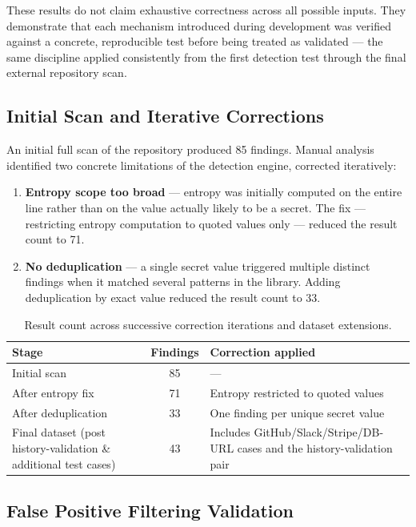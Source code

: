 \documentclass[12pt]{article}
\begin{document}
These results do not claim exhaustive correctness across all possible inputs. They demonstrate that each mechanism introduced during development was verified against a concrete, reproducible test before being treated as validated --- the same discipline applied consistently from the first detection test through the final external repository scan.

\subsection{Initial Scan and Iterative Corrections}

An initial full scan of the repository produced 85 findings. Manual analysis identified two concrete limitations of the detection engine, corrected iteratively:

\begin{enumerate}
    \item \textbf{Entropy scope too broad} --- entropy was initially computed on the entire line rather than on the value actually likely to be a secret. The fix --- restricting entropy computation to quoted values only --- reduced the result count to 71.
    \item \textbf{No deduplication} --- a single secret value triggered multiple distinct findings when it matched several patterns in the library. Adding deduplication by exact value reduced the result count to 33.
\end{enumerate}

\begin{table}[h]
\centering
\begin{tabularx}{\textwidth}{|p{}|c|Y|}
\hline
\textbf{Stage} & \textbf{Findings} & \textbf{Correction applied} \\
\hline
Initial scan & 85 & --- \\
After entropy fix & 71 & Entropy restricted to quoted values \\
After deduplication & 33 & One finding per unique secret value \\
Final dataset (post history-validation \& additional test cases) & 43 & Includes GitHub/Slack/Stripe/DB-URL cases and the history-validation pair \\
\hline
\end{tabularx}
\caption{Result count across successive correction iterations and dataset extensions.}
\label{tab:iterations}
\end{table}

\subsection{False Positive Filtering Validation}
\end{document}

